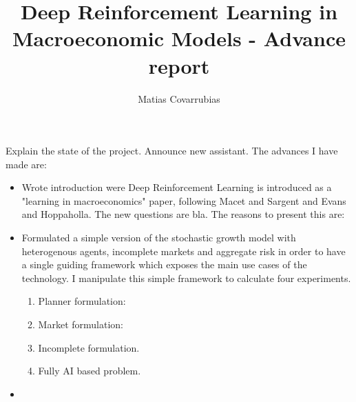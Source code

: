 \documentclass[11pt,english]{article}
\begin{document}
\title{Deep Reinforcement Learning in Macroeconomic Models - Advance report}
\author{Matias Covarrubias}
\maketitle

Explain the state of the project. Announce new assistant. The advances I have made are:

\begin{itemize}
	\item Wrote introduction were Deep Reinforcement Learning is introduced as a "learning in macroeconomics" paper, following   Macet and Sargent and Evans and Hoppaholla. The new questions are bla. The reasons to present this are:  \medskip
	
	\item Formulated a simple version of the stochastic growth model with heterogenous agents, incomplete markets and aggregate risk in order to have a single guiding framework which exposes the main use cases of the technology. I manipulate this simple framework to calculate four experiments. \medskip
	
	\begin{enumerate}
		\item Planner formulation: \medskip
		\item Market formulation: \medskip
		\item Incomplete formulation. \medskip
		\item Fully AI based problem. \medskip
	\end{enumerate}

	\item 
\end{itemize}
\end{document}
